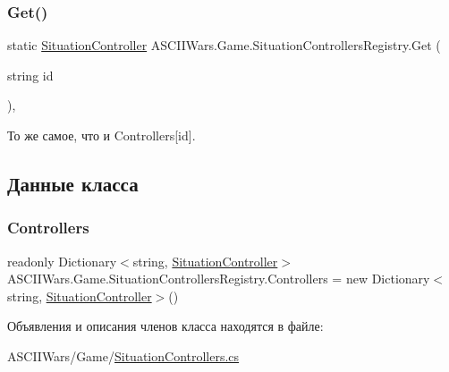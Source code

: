 \subsubsection{\texorpdfstring{Get()}{Get()}}
{\footnotesize\ttfamily static \hyperlink{interface_a_s_c_i_i_wars_1_1_game_1_1_situation_controller}{Situation\+Controller} A\+S\+C\+I\+I\+Wars.\+Game.\+Situation\+Controllers\+Registry.\+Get (\begin{DoxyParamCaption}\item[{string}]{id }\end{DoxyParamCaption})\hspace{0.3cm}{\ttfamily [inline]}, {\ttfamily [static]}}



То же самое, что и {\ttfamily Controllers\mbox{[}id\mbox{]}}. 



\subsection{Данные класса}
\hypertarget{class_a_s_c_i_i_wars_1_1_game_1_1_situation_controllers_registry_a1fbefd2e6e4140f5d703ffb7367fee20}{}\label{class_a_s_c_i_i_wars_1_1_game_1_1_situation_controllers_registry_a1fbefd2e6e4140f5d703ffb7367fee20} 
\subsubsection{\texorpdfstring{Controllers}{Controllers}}
{\footnotesize\ttfamily readonly Dictionary$<$string, \hyperlink{interface_a_s_c_i_i_wars_1_1_game_1_1_situation_controller}{Situation\+Controller}$>$ A\+S\+C\+I\+I\+Wars.\+Game.\+Situation\+Controllers\+Registry.\+Controllers = new Dictionary$<$string, \hyperlink{interface_a_s_c_i_i_wars_1_1_game_1_1_situation_controller}{Situation\+Controller}$>$()\hspace{0.3cm}{\ttfamily [static]}}



Объявления и описания членов класса находятся в файле\+:\begin{DoxyCompactItemize}
\item 
A\+S\+C\+I\+I\+Wars/\+Game/\hyperlink{_situation_controllers_8cs}{Situation\+Controllers.\+cs}\end{DoxyCompactItemize}
